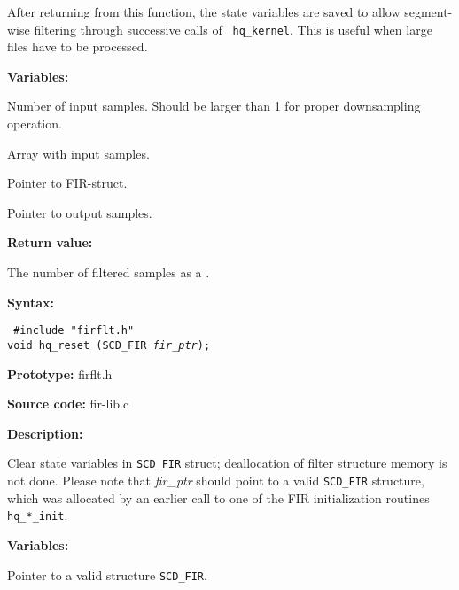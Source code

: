 After returning from this function, the state variables are saved to
allow segment-wise filtering through successive calls of {\tt
hq\_kernel}. This is useful when large files have to be processed.


{\bf Variables: }
\begin{Descr}{\DescrLen}
\item[\pbox{20mm}{\em lseg}] %
        Number of input samples. Should be larger than 1 for proper
        downsampling operation.

\item[\pbox{20mm}{\em x\_ptr}] %
        Array with input samples.

\item[\pbox{20mm}{\em fir\_ptr}] %
        Pointer to FIR-struct.

\item[\pbox{20mm}{\em y\_ptr}] %
        Pointer to output samples.
\end{Descr}

{\bf Return value: }

The number of filtered samples as a \long.




{\bf Syntax: }

{\tt
\#include "firflt.h"\\
void hq\_reset (SCD\_FIR {\em *fir\_ptr});
}

{\bf Prototype: }    firflt.h

{\bf Source code: }  fir-lib.c

{\bf Description: }

Clear state variables in {\tt SCD\_FIR} struct; deallocation of filter
structure memory is not done. Please note that {\em fir\_ptr} should
point to a valid {\tt SCD\_FIR} structure, which was allocated by an
earlier call to one of the FIR initialization routines {\tt
hq\_*\_init}.

{\bf Variables: }
\begin{Descr}{\DescrLen}
\item[\pbox{20mm}{\em fir\_ptr}] %
        Pointer to a valid structure {\tt SCD\_FIR}.
\end{Descr}


